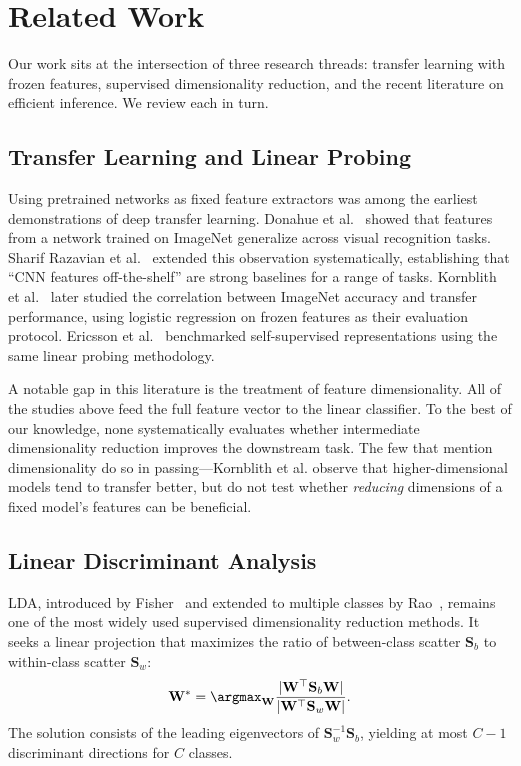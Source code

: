 \section{Related Work}
\label{sec:related_work}

Our work sits at the intersection of three research threads: transfer learning with frozen features, supervised dimensionality reduction, and the recent literature on efficient inference. We review each in turn.

\subsection{Transfer Learning and Linear Probing}

Using pretrained networks as fixed feature extractors was among the earliest demonstrations of deep transfer learning. Donahue et al.~\cite{donahue2014decaf} showed that features from a network trained on ImageNet generalize across visual recognition tasks. Sharif Razavian et al.~\cite{sharif2014cnn} extended this observation systematically, establishing that ``CNN features off-the-shelf'' are strong baselines for a range of tasks. Kornblith et al.~\cite{kornblith2019better} later studied the correlation between ImageNet accuracy and transfer performance, using logistic regression on frozen features as their evaluation protocol. Ericsson et al.~\cite{ericsson2021well} benchmarked self-supervised representations using the same linear probing methodology.

A notable gap in this literature is the treatment of feature dimensionality. All of the studies above feed the full feature vector to the linear classifier. To the best of our knowledge, none systematically evaluates whether intermediate dimensionality reduction improves the downstream task. The few that mention dimensionality do so in passing---Kornblith et al. observe that higher-dimensional models tend to transfer better, but do not test whether \emph{reducing} dimensions of a fixed model's features can be beneficial.

\subsection{Linear Discriminant Analysis}

LDA, introduced by Fisher~\cite{fisher1936lda} and extended to multiple classes by Rao~\cite{rao1948utilization}, remains one of the most widely used supervised dimensionality reduction methods. It seeks a linear projection that maximizes the ratio of between-class scatter $\mathbf{S}_b$ to within-class scatter $\mathbf{S}_w$:
\begin{equation}
\mathbf{W}^* = \argmax_{\mathbf{W}} \frac{|\mathbf{W}^\top \mathbf{S}_b \mathbf{W}|}{|\mathbf{W}^\top \mathbf{S}_w \mathbf{W}|}.
\label{eq:lda_objective}
\end{equation}
The solution consists of the leading eigenvectors of $\mathbf{S}_w^{-1}\mathbf{S}_b$, yielding at most $C-1$ discriminant directions for $C$ classes.

